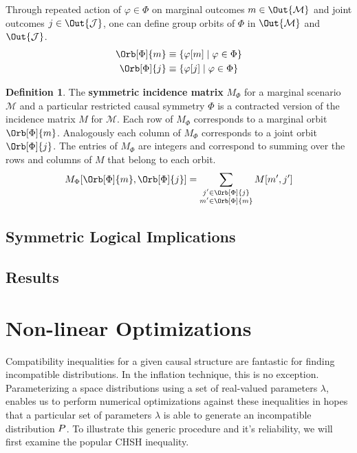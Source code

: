 \documentclass[aps, 10pt, english, twoside, pra, nofootinbib, longbibliography]{revtex4-1}
\theoremstyle{plain}
\theoremstyle{definition}
\newtheorem{definition}[theorem]{Definition}
\theoremstyle{remark}
\newcommand{\gelem}{\varphi}
\newcommand{\action}[1]{\gelem\bs{#1}}
\newcommand{\mscenario}{\mathcal{M}}
\newcommand{\jointvar}{\mathcal{J}}
\newcommand{\term}[1]{\textcolor{Mahogany}{\textbf{#1}}}
\begin{document}
    Through repeated action of $\gelem \in \Phi$ on marginal outcomes $m \in \Out{\mscenario}$ and joint outcomes $j \in \Out{\jointvar}$, one can define group orbits of $\Phi$ in $\Out{\mscenario}$ and $\Out{\jointvar}$.
    \begin{align*}
        \Orb[\Phi]{m} &\defined \bc{\action{m} \mid \gelem \in \Phi} \\
        \Orb[\Phi]{j} &\defined \bc{\action{j} \mid \gelem \in \Phi}
    \end{align*}

    \begin{definition}
        The \term{symmetric incidence matrix} $M_{\Phi}$ for a marginal scenario $\mscenario$ and a particular restricted causal symmetry $\Phi$ is a contracted version of the incidence matrix $M$ for $\mscenario$. Each row of $M_{\Phi}$ corresponds to a marginal orbit $\Orb[\Phi]{m}$. Analogously each column of $M_{\Phi}$ corresponds to a joint orbit $\Orb[\Phi]{j}$. The entries of $M_{\Phi}$ are integers and correspond to summing over the rows and columns of $M$ that belong to each orbit.
        \[ M_{\Phi}\bs{\Orb[\Phi]{m}, \Orb[\Phi]{j}} = \sum_{\substack{j' \in \Orb[\Phi]{j} \\ m' \in \Orb[\Phi]{m}}} M\bs{m',j'} \]
    \end{definition}


    \subsection{Symmetric Logical Implications}
    \subsection{Results}

    \section{Non-linear Optimizations}
    \label{sec:optimizations}
    Compatibility inequalities for a given causal structure are fantastic for finding incompatible distributions. In the inflation technique, this is no exception. Parameterizing a space distributions using a set of real-valued parameters $\lambda$, enables us to perform numerical optimizations against these inequalities in hopes that a particular set of parameters $\lambda$ is able to generate an incompatible distribution $\prob$. To illustrate this generic procedure and it's reliability, we will first examine the popular CHSH inequality.
\end{document}
